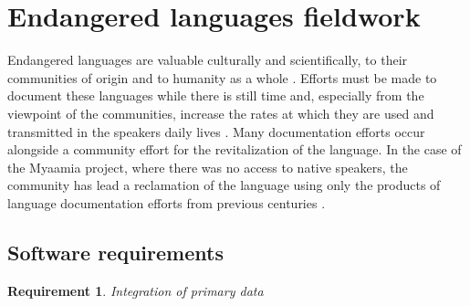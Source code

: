 \documentclass[11pt]{article}
\newtheorem{requirement}{Requirement}
\begin{document}
\section{Endangered languages fieldwork}\label{sec:fieldwork}

Endangered languages are valuable culturally and scientifically, to their
communities of origin \cite{Ironstrack:2012} and to humanity as a whole
\cite{harrison2007languages}. Efforts must be made to document these languages
while there is still time and, especially from the viewpoint of the
communities, increase the rates at which they are used and transmitted in the
speakers daily lives \cite{Myaamia:2001}.  Many documentation efforts occur
alongside a community effort for the revitalization of the language.  In the
case of the Myaamia project, where there was no access to native speakers, the
community has lead a reclamation \cite{Leonard:2012} of the language using only
the products of language documentation efforts from previous centuries
\cite{Costa:2012}.


\subsection{Software requirements}
\label{sec:requirements}


\begin{requirement}
	\label{req:primary-data}
       Integration of primary data
\end{requirement}
\end{document}

